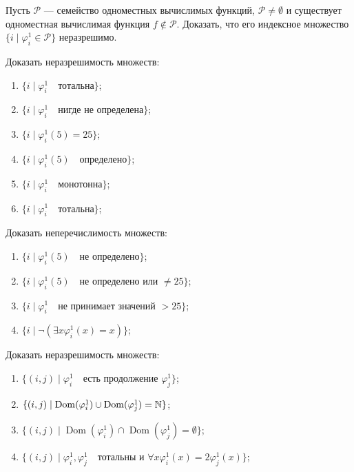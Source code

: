 \documentclass[a4paper, 12pt, num=ТА3]{listok}
\renewcommand{\phi}{\varphi}
\DeclareMathOperator{\Dom}{Dom}
\begin{document}
\begin{problem}
	Пусть $\mathcal{P}$ --- семейство одноместных вычислимых функций, $\mathcal{P} \ne \emptyset$ и существует одноместная вычислимая функция $f \notin \mathcal{P}$.
	Доказать, что его индексное множество $\{i \mid \phi^1_i \in \mathcal{P}\}$ неразрешимо.
\end{problem}
\begin{problem}
	Доказать неразрешимость множеств:
	\begin{enumerate}
		\item $\{i \mid \phi^1_i \quad{} \text{тотальна}\}$;
		\item $\{i \mid \phi^1_i \quad{} \text{нигде не определена}\}$;
		\item $\{i \mid \phi^1_i (5) = 25\}$;
		\item $\{i \mid \phi^1_i(5) \quad{} \text{определено}\}$;
		\item $\{i \mid \phi^1_i \quad{} \text{монотонна}\}$;
		\item $\{i \mid \phi^1_i \quad{} \text{тотальна}\}$;
	\end{enumerate}
\end{problem}
\begin{problem}
	Доказать неперечислимость множеств:
	\begin{enumerate}
		\item $\{i \mid \phi^1_i(5) \quad{}\text{не определено}\}$;
		\item $\{i \mid \phi^1_i(5) \quad{} \text{не определено или $\ne 25$}\}$;
		\item $\{i \mid \phi^1_i \quad{}\text{не принимает значений $> 25$}\}$;
		\item $\{i \mid \neg(\exists{x} \phi^1_i(x) = x)\}$;
	\end{enumerate}
\end{problem}
\begin{problem}
	Доказать неразрешимость множеств:
	\begin{enumerate}
		\item $\{(i, j) \mid \phi^1_i \quad{} \text{есть продолжение $\phi^1_j$}\}$;
		\item $\{(i, j) \mid \Dom(\phi^1_i) \cup \Dom(\phi^1_j) = \N \}$;
		\item $\{(i, j) \mid \Dom(\phi^1_i) \cap \Dom(\phi^1_j) = \emptyset\}$;
		\item $\{(i, j) \mid \phi^1_i, \phi^1_j \quad\text{тотальны и $\forall{x} \phi^1_i(x) = 2\phi^1_j(x)$}\}$;
	\end{enumerate}
\end{problem}
\end{document}
